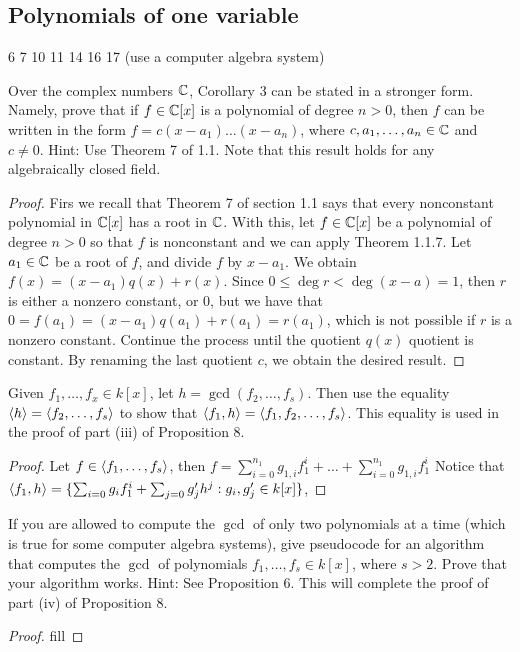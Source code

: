 \subsection{Polynomials of one variable}

6
7
10
11
14
16
17 (use a computer algebra system)

\begin{exercise}{1}
Over the complex numbers $\mathbb{C}$, Corollary 3 can be stated in a stronger form. Namely, prove that if $f\in\mathbb{C}[x]$ is a polynomial of degree $n>0$, then $f$ can be written in the form $f=c(x-a_1)\dots(x-a_n)$, where $c,a_1,\dots,a_n\in\mathbb{C}$ and $c\neq 0$. Hint: Use Theorem 7 of 1.1. Note that this result holds for any algebraically closed field.
\end{exercise}
\begin{proof}
Firs we recall that Theorem 7 of section 1.1 says that every nonconstant polynomial in $\mathbb{C}[x]$ has a root in $\mathbb{C}$. With this, let $f\in\mathbb{C}[x]$ be a polynomial of degree $n>0$ so that $f$ is nonconstant and we can apply Theorem 1.1.7. Let $a_1\in\mathbb{C}$ be a root of $f$, and divide $f$ by $x-a_1$. We obtain $f(x)=(x-a_1)q(x)+r(x)$. Since $0\leq\deg r<\deg (x-a)=1$, then $r$ is either a nonzero constant, or 0, but we have that $0 =f(a_1) =(x-a_1)q(a_1)+r(a_1) =r(a_1)$, which is not possible if $r$ is a nonzero constant. Continue the process until the quotient $q(x)$ quotient is constant. By renaming the last quotient $c$, we obtain the desired result.
\end{proof}

\begin{exercise}{6}
Given $f_1,\dots,f_x\in k[x]$, let $h=\gcd(f_2,\dots,f_s)$. Then use the equality $\langle h\rangle=\langle f_2,\dots,f_s\rangle$ to show that $\langle f_1,h\rangle=\langle f_1,f_2,\dots,f_s\rangle$. This equality is used in the proof of part (iii) of Proposition 8.
\end{exercise}
\begin{proof}
Let $f\in\langle f_1,\dots,f_s\rangle$, then $f=\sum_{i=0}^{n_1}g_{1,i}f_1^i+\dots+\sum_{i=0}^{n_1}g_{1,i}f_1^i$
Notice that $\langle f_1,h\rangle=\{\sum_{i=0}g_if_1^i+\sum_{j=0}g_j'h^j: g_i,g_j'\in k[x]\}$, 
\end{proof}

\begin{exercise}{7}
If you are allowed to compute the $\gcd$ of only two polynomials at a time (which is true for some computer algebra systems), give pseudocode for an algorithm that computes the $\gcd$ of polynomials $f_1,\dots,f_s\in k[x]$, where $s>2$. Prove that your algorithm works. Hint: See Proposition 6. This will complete the proof of part (iv) of Proposition 8.
\end{exercise}
\begin{proof}
fill
\end{proof}

